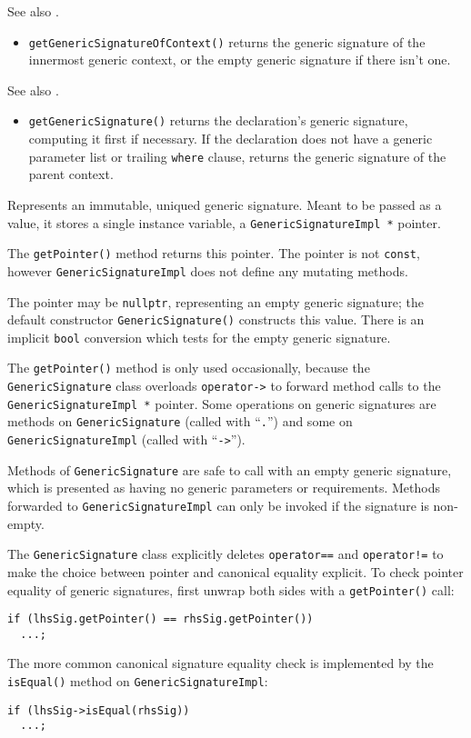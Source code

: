 \documentclass[../generics]{subfiles}
\begin{document}
See also .
\begin{itemize}
\item \texttt{getGenericSignatureOfContext()} returns the generic signature of the innermost generic context, or the empty generic signature if there isn't one.
\end{itemize}

See also .
\begin{itemize}
\item \texttt{getGenericSignature()} returns the declaration's generic signature, computing it first if necessary. If the declaration does not have a generic parameter list or trailing \texttt{where} clause, returns the generic signature of the parent context.
\end{itemize}

Represents an immutable, uniqued generic signature. Meant to be passed as a value, it stores a single instance variable, a \texttt{GenericSignatureImpl *} pointer.

The \texttt{getPointer()} method returns this pointer. The pointer is not \texttt{const}, however \texttt{GenericSignatureImpl} does not define any mutating methods.

The pointer may be \texttt{nullptr}, representing an empty generic signature; the default constructor \texttt{GenericSignature()} constructs this value. There is an implicit \texttt{bool} conversion which tests for the empty generic signature.

The \texttt{getPointer()} method is only used occasionally, because the \texttt{GenericSignature} class overloads \texttt{operator->} to forward method calls to the \texttt{GenericSignatureImpl *} pointer. Some operations on generic signatures are methods on \texttt{GenericSignature} (called with ``\texttt{.}'') and some on \texttt{GenericSignatureImpl} (called with ``\texttt{->}'').

Methods of \texttt{GenericSignature} are safe to call with an empty generic signature, which is presented as having no generic parameters or requirements. Methods forwarded to \texttt{GenericSignatureImpl} can only be invoked if the signature is non-empty.

The \texttt{GenericSignature} class explicitly deletes \texttt{operator==} and \texttt{operator!=} to make the choice between pointer and canonical equality explicit. To check pointer equality of generic signatures, first unwrap both sides with a \texttt{getPointer()} call:
\begin{Verbatim}
if (lhsSig.getPointer() == rhsSig.getPointer())
  ...;
\end{Verbatim}
The more common canonical signature equality check is implemented by the \texttt{isEqual()} method on \texttt{GenericSignatureImpl}:
\begin{Verbatim}
if (lhsSig->isEqual(rhsSig))
  ...;
\end{Verbatim}
\end{document}
